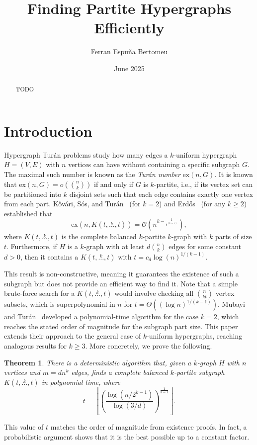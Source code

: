 \documentclass[11pt,a4paper]{article}
\title{Finding Partite Hypergraphs Efficiently}
\author{Ferran Espuña Bertomeu}
\date{June 2025}
\newcommand{\ex}[2]{\ensuremath{\mathrm{ex}(#1, #2)}}
\newcommand{\compoverset}[2]{\ensuremath{K(#2, \overset{#1}{\dots}, #2)}}
\newcommand{\bigO}[1]{\ensuremath{\mathcal{O}(#1)}}
\newtheorem{theorem}{Theorem}
\theoremstyle{definition}
\begin{document}
\maketitle

\begin{abstract}
TODO %
\end{abstract}

\section{Introduction}\label{sec:introduction}

Hypergraph Turán problems study how many edges a $k$-uniform hypergraph $H = (V, E)$ with $n$ vertices can have without containing a specific subgraph $G$.
The maximal such number is known as the \emph{Turán number} $\ex{n}{G}$.
It is known %
that $\ex{n}{G} = o\left( \binom{n}{k}\right)$ if and only if $G$ is $k$-partite, i.e.,
if its vertex set can be partitioned into $k$ disjoint sets such that each edge contains exactly one vertex from each part.
Kővári, Sós, and Turán~\cite{Kovari1954} (for $k=2$) and
Erdős~\cite{Erods1964} (for any $k \geq 2$) established that
\begin{equation} \label{eq:erdos64-intro}
    \ex{n}{\compoverset{k}{t}} = \bigO{n^{k - \frac{1}{t^{(k-1)}}}},
\end{equation}
where $\compoverset{k}{t}$ is the complete balanced $k$-partite $k$-graph with $k$ parts of size $t$.
Furthermore, if $H$ is a $k$-graph with at least $d \binom{n}{k}$ edges for some constant $d > 0$, then it contains a $\compoverset{k}{t}$ with
$t = c_d \log(n)^{1/(k-1)}$.

This result is non-constructive, meaning it guarantees the existence of such a subgraph but does not provide an efficient way to find it.
Note that a simple brute-force search for a $\compoverset{k}{t}$ would involve checking all $\binom{n}{kt}$ vertex subsets, which is superpolynomial in $n$ for $t = \Theta((\log n)^{1/(k-1)})$.
Mubayi and Turán~\cite{MUBAYI2010174} developed a polynomial-time algorithm for the case $k=2$, which reaches the stated order of magnitude for the subgraph part size.
This paper extends their approach to the general case of $k$-uniform hypergraphs, reaching analogous results for $k \ge 3$.
More concretely, we prove the following.

\begin{theorem} \label{thm:main_theorem}
There is a deterministic algorithm that, given a $k$-graph $H$ with $n$ vertices and $m=dn^k$ edges, finds a complete balanced $k$-partite subgraph $\compoverset{k}{t}$ in polynomial time, where
\[
    t = \left\lfloor \left( \frac{\log(n/2^{k-1})}{\log(3/d)} \right)^{\frac{1}{k-1}} \right\rfloor.
\]
\end{theorem}
This value of $t$ matches the order of magnitude from existence proofs.
In fact, a probabilistic argument shows that it is the best possible up to a constant factor.
\end{document}
